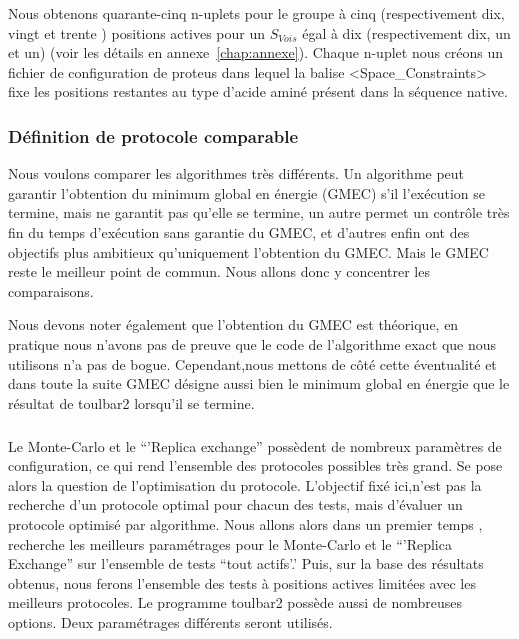 Nous obtenons quarante-cinq n-uplets pour le groupe à cinq (respectivement dix, vingt et trente ) positions actives pour un $S_{Vois}$ égal à dix (respectivement dix, un et un) (voir les détails en annexe~\ref{chap:annexe}). Chaque n-uplet nous créons un fichier de configuration de proteus dans lequel la balise <Space\_Constraints> fixe les positions restantes au type d'acide aminé présent dans la séquence native. 


\subsubsection{Définition de protocole comparable}
\label{sec:proto_compa}
Nous voulons comparer les algorithmes très différents. Un algorithme peut garantir l'obtention du minimum global en énergie (GMEC) s'il l'exécution se termine, mais ne garantit pas qu'elle se termine, un autre permet un contrôle très fin du temps d'exécution sans garantie du GMEC, et d'autres enfin ont des objectifs plus ambitieux  qu'uniquement l'obtention du GMEC.
Mais le GMEC reste le meilleur point de commun. Nous allons donc y concentrer les comparaisons.

Nous devons noter également que l'obtention du GMEC est théorique, en pratique nous n'avons pas de preuve que le code de l'algorithme exact que nous utilisons n'a pas de bogue. Cependant,nous mettons de côté cette éventualité et dans toute la suite GMEC désigne aussi bien le minimum global en énergie que le résultat de toulbar2 lorsqu'il se termine.  
\subparagraph{}
Le Monte-Carlo et le ``'Replica exchange'' possèdent de nombreux paramètres de configuration, ce qui rend l'ensemble des protocoles possibles très grand. Se pose alors la question de l'optimisation du protocole. L'objectif fixé ici,n'est pas la recherche d'un protocole optimal pour chacun des tests, mais d'évaluer un protocole optimisé par algorithme.
Nous allons alors dans un premier temps , recherche les meilleurs paramétrages pour le Monte-Carlo et le ``'Replica Exchange'' sur l'ensemble de tests ``tout actifs'.'
Puis, sur la base des résultats obtenus, nous ferons l'ensemble des tests à positions actives limitées avec les meilleurs protocoles.
Le programme toulbar2 possède aussi de nombreuses options. Deux paramétrages différents seront utilisés.


